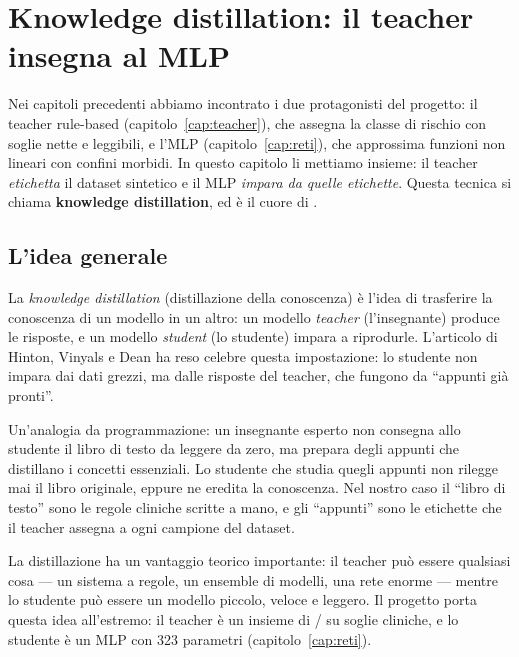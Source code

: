
\chapter{Knowledge distillation: il teacher insegna al MLP}\label{cap:distillazione}

Nei capitoli precedenti abbiamo incontrato i due protagonisti del progetto: il
teacher rule-based (capitolo~\ref{cap:teacher}), che assegna la classe di
rischio con soglie nette e leggibili, e l'MLP (capitolo~\ref{cap:reti}), che
approssima funzioni non lineari con confini morbidi. In questo capitolo li
mettiamo insieme: il teacher \emph{etichetta} il dataset sintetico e il
MLP \emph{impara da quelle etichette}. Questa tecnica si chiama
\textbf{knowledge distillation}, ed è il cuore di \progetto{}.

\section{L'idea generale}\label{sec:idea-generale}

La \emph{knowledge distillation} (distillazione della conoscenza) è
l'idea di trasferire la conoscenza di un modello in un altro: un modello
\emph{teacher} (l'insegnante) produce le risposte, e un modello
\emph{student} (lo studente) impara a riprodurle. L'articolo di Hinton,
Vinyals e Dean \cite{hinton2015distilling} ha reso celebre questa
impostazione: lo studente non impara dai dati grezzi, ma dalle risposte del
teacher, che fungono da ``appunti già pronti''.

Un'analogia da programmazione: un insegnante esperto non consegna allo
studente il libro di testo da leggere da zero, ma prepara degli appunti che
distillano i concetti essenziali. Lo studente che studia quegli appunti non
rilegge mai il libro originale, eppure ne eredita la conoscenza. Nel nostro
caso il ``libro di testo'' sono le regole cliniche scritte a mano, e gli
``appunti'' sono le etichette che il teacher assegna a ogni campione del
dataset.

La distillazione ha un vantaggio teorico importante: il teacher può essere
qualsiasi cosa — un sistema a regole, un ensemble di modelli, una rete
enorme — mentre lo studente può essere un modello piccolo, veloce e
leggero. Il progetto \progetto{} porta questa idea all'estremo: il teacher
è un insieme di / su soglie cliniche, e lo studente
è un MLP con 323 parametri (capitolo~\ref{cap:reti}).

